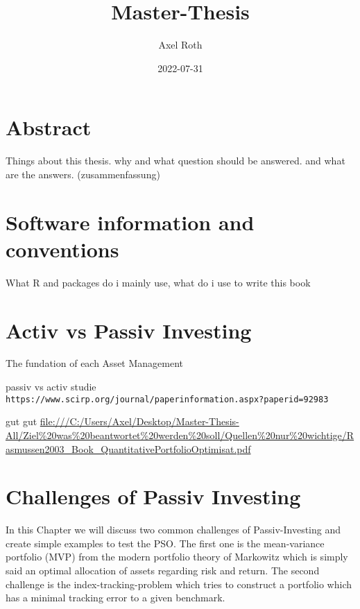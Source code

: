 \documentclass[
  oneside]{book}
\title{Master-Thesis}
\author{Axel Roth}
\date{2022-07-31}
\begin{document}
\maketitle

{
\setcounter{tocdepth}{1}
\tableofcontents
}
\hypertarget{abstract}{%
\chapter{Abstract}\label{abstract}}

Things about this thesis. why and what question should be answered. and what are the answers. (zusammenfassung)

\hypertarget{software-information-and-conventions}{%
\chapter{Software information and conventions}\label{software-information-and-conventions}}

What R and packages do i mainly use, what do i use to write this book

\hypertarget{activ-vs-passiv-investing}{%
\chapter{Activ vs Passiv Investing}\label{activ-vs-passiv-investing}}

The fundation of each Asset Management

passiv vs activ studie
\texttt{https://www.scirp.org/journal/paperinformation.aspx?paperid=92983}

gut gut
\url{file:///C:/Users/Axel/Desktop/Master-Thesis-All/Ziel\%20was\%20beantwortet\%20werden\%20soll/Quellen\%20nur\%20wichtige/Rasmussen2003_Book_QuantitativePortfolioOptimisat.pdf}

\hypertarget{challenges-of-passiv-investing}{%
\chapter{Challenges of Passiv Investing}\label{challenges-of-passiv-investing}}

In this Chapter we will discuss two common challenges of Passiv-Investing and create simple examples to test the PSO. The first one is the mean-variance portfolio (MVP) from the modern portfolio theory of Markowitz which is simply said an optimal allocation of assets regarding risk and return. The second challenge is the index-tracking-problem which tries to construct a portfolio which has a minimal tracking error to a given benchmark.
\end{document}
